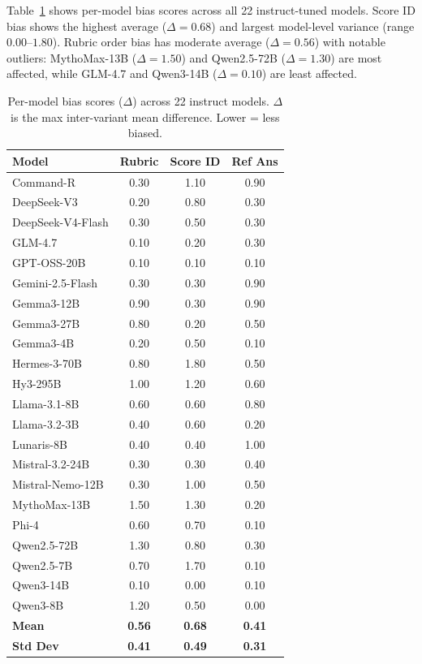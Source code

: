 \documentclass[11pt,twocolumn]{article}
\begin{document}
Table~\ref{tab:per_model} shows per-model bias scores across all 22 instruct-tuned models. Score ID bias shows the highest average ($\Delta = 0.68$) and largest model-level variance (range $0.00$--$1.80$). Rubric order bias has moderate average ($\Delta = 0.56$) with notable outliers: MythoMax-13B ($\Delta = 1.50$) and Qwen2.5-72B ($\Delta = 1.30$) are most affected, while GLM-4.7 and Qwen3-14B ($\Delta = 0.10$) are least affected.

\begin{table}[h]
\centering\small
\caption{Per-model bias scores ($\Delta$) across 22 instruct models. $\Delta$ is the max inter-variant mean difference. Lower = less biased.}
\label{tab:per_model}
\begin{tabular}{lccc}
\toprule
\textbf{Model} & \textbf{Rubric} & \textbf{Score ID} & \textbf{Ref Ans} \\
\midrule
Command-R & 0.30 & 1.10 & 0.90 \\
DeepSeek-V3 & 0.20 & 0.80 & 0.30 \\
DeepSeek-V4-Flash & 0.30 & 0.50 & 0.30 \\
GLM-4.7 & 0.10 & 0.20 & 0.30 \\
GPT-OSS-20B & 0.10 & 0.10 & 0.10 \\
Gemini-2.5-Flash & 0.30 & 0.30 & 0.90 \\
Gemma3-12B & 0.90 & 0.30 & 0.90 \\
Gemma3-27B & 0.80 & 0.20 & 0.50 \\
Gemma3-4B & 0.20 & 0.50 & 0.10 \\
Hermes-3-70B & 0.80 & 1.80 & 0.50 \\
Hy3-295B & 1.00 & 1.20 & 0.60 \\
Llama-3.1-8B & 0.60 & 0.60 & 0.80 \\
Llama-3.2-3B & 0.40 & 0.60 & 0.20 \\
Lunaris-8B & 0.40 & 0.40 & 1.00 \\
Mistral-3.2-24B & 0.30 & 0.30 & 0.40 \\
Mistral-Nemo-12B & 0.30 & 1.00 & 0.50 \\
MythoMax-13B & 1.50 & 1.30 & 0.20 \\
Phi-4 & 0.60 & 0.70 & 0.10 \\
Qwen2.5-72B & 1.30 & 0.80 & 0.30 \\
Qwen2.5-7B & 0.70 & 1.70 & 0.10 \\
Qwen3-14B & 0.10 & 0.00 & 0.10 \\
Qwen3-8B & 1.20 & 0.50 & 0.00 \\
\midrule
\textbf{Mean} & \textbf{0.56} & \textbf{0.68} & \textbf{0.41} \\
\textbf{Std Dev} & \textbf{0.41} & \textbf{0.49} & \textbf{0.31} \\
\bottomrule
\end{tabular}
\end{table}
\end{document}
